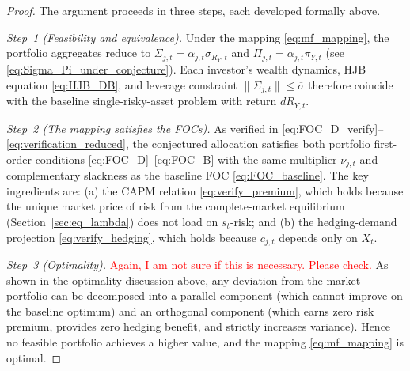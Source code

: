 \documentclass[11pt,english]{article}
\begin{document}
\begin{proof}
The argument proceeds in three steps, each developed formally above.

\emph{Step~1 (Feasibility and equivalence).} Under the mapping \eqref{eq:mf_mapping}, the portfolio aggregates reduce to $\Sigma_{j,t}=\alpha_{j,t}\sigma_{R_Y,t}$ and $\Pi_{j,t}=\alpha_{j,t}\pi_{Y,t}$ (see \eqref{eq:Sigma_Pi_under_conjecture}). Each investor's wealth dynamics, HJB equation \eqref{eq:HJB_DB}, and leverage constraint $\|\Sigma_{j,t}\|\le\overline{\sigma}$ therefore coincide with the baseline single-risky-asset problem with return $dR_{Y,t}$.

\emph{Step~2 (The mapping satisfies the FOCs).} As verified in \eqref{eq:FOC_D_verify}--\eqref{eq:verification_reduced}, the conjectured allocation satisfies both portfolio first-order conditions \eqref{eq:FOC_D}--\eqref{eq:FOC_B} with the same multiplier $\nu_{j,t}$ and complementary slackness as the baseline FOC \eqref{eq:FOC_baseline}. The key ingredients are: (a) the CAPM relation \eqref{eq:verify_premium}, which holds because the unique market price of risk from the complete-market equilibrium (Section~\ref{sec:eq_lambda}) does not load on $s_t$-risk; and (b) the hedging-demand projection \eqref{eq:verify_hedging}, which holds because $c_{j,t}$ depends only on $X_t$.

\emph{Step~3 (Optimality).} \textcolor{red}{Again, I am not sure if this is necessary. Please check.} As shown in the optimality discussion above, any deviation from the market portfolio can be decomposed into a parallel component (which cannot improve on the baseline optimum) and an orthogonal component (which earns zero risk premium, provides zero hedging benefit, and strictly increases variance). Hence no feasible portfolio achieves a higher value, and the mapping \eqref{eq:mf_mapping} is optimal.
\end{proof}

\end{document}

